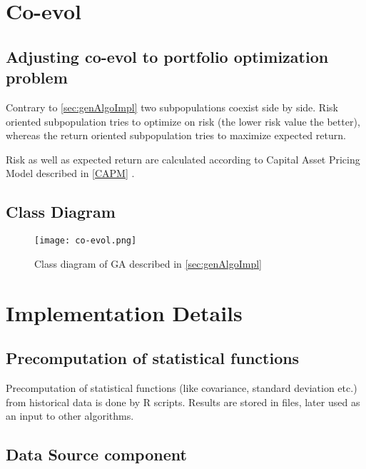 \section{Co-evol}

\subsection{Adjusting co-evol to portfolio optimization problem}

Contrary to \ref{sec:genAlgoImpl} two subpopulations coexist side by side.
Risk oriented subpopulation tries to optimize on risk (the lower risk value the better), whereas the return oriented subpopulation tries to maximize expected return.

Risk as well as expected return are calculated according to Capital Asset Pricing Model described in \ref{CAPM} .



\subsection{Class Diagram}

\begin{figure}[H]   
	    \begin{center}
	      \texttt{[image: co-evol.png]}
	    \end{center}
	    \caption{Class diagram of GA described in \ref{sec:genAlgoImpl}} 
	  \end{figure}



\section{Implementation Details}
\label{sec:implDetails}

\subsection{Precomputation of statistical functions}
\label{precompute}
Precomputation of statistical functions (like covariance, standard deviation etc.) from historical data is done by R scripts. 
Results are stored in files, later used as an input to other algorithms.

\subsection{Data Source component}
\label{dataSource}


